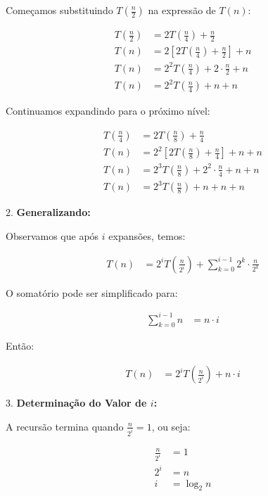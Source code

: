 \documentclass{article}
\begin{document}
   Começamos substituindo \(T\left(\frac{n}{2}\right)\) na expressão de \(T(n)\):

   \begin{align*}
       T\left(\frac{n}{2}\right) &= 2T\left(\frac{n}{4}\right) + \frac{n}{2} \\
       T(n) &= 2 \left[2T\left(\frac{n}{4}\right) + \frac{n}{2}\right] + n \\
       T(n) &= 2^2T\left(\frac{n}{4}\right) + 2 \cdot \frac{n}{2} + n \\
       T(n) &= 2^2T\left(\frac{n}{4}\right) + n + n
   \end{align*}

   Continuamos expandindo para o próximo nível:

   \begin{align*}
       T\left(\frac{n}{4}\right) &= 2T\left(\frac{n}{8}\right) + \frac{n}{4} \\
       T(n) &= 2^2 \left[2T\left(\frac{n}{8}\right) + \frac{n}{4}\right] + n + n \\
       T(n) &= 2^3T\left(\frac{n}{8}\right) + 2^2 \cdot \frac{n}{4} + n + n \\
       T(n) &= 2^3T\left(\frac{n}{8}\right) + n + n + n
   \end{align*}

2. \textbf{Generalizando:}

   Observamos que após \(i\) expansões, temos:

   \begin{align*}
       T(n) &= 2^i T\left(\frac{n}{2^i}\right) + \sum_{k=0}^{i-1} 2^k \cdot \frac{n}{2^k}
   \end{align*}

   O somatório pode ser simplificado para:

   \begin{align*}
       \sum_{k=0}^{i-1} n &= n \cdot i
   \end{align*}

   Então:

   \begin{align*}
       T(n) &= 2^i T\left(\frac{n}{2^i}\right) + n \cdot i
   \end{align*}

3. \textbf{Determinação do Valor de \(i\):}

   A recursão termina quando \( \frac{n}{2^i} = 1 \), ou seja:

   \begin{align*}
       \frac{n}{2^i} &= 1 \\
       2^i &= n \\
       i &= \log_2 n
   \end{align*}
\end{document}
